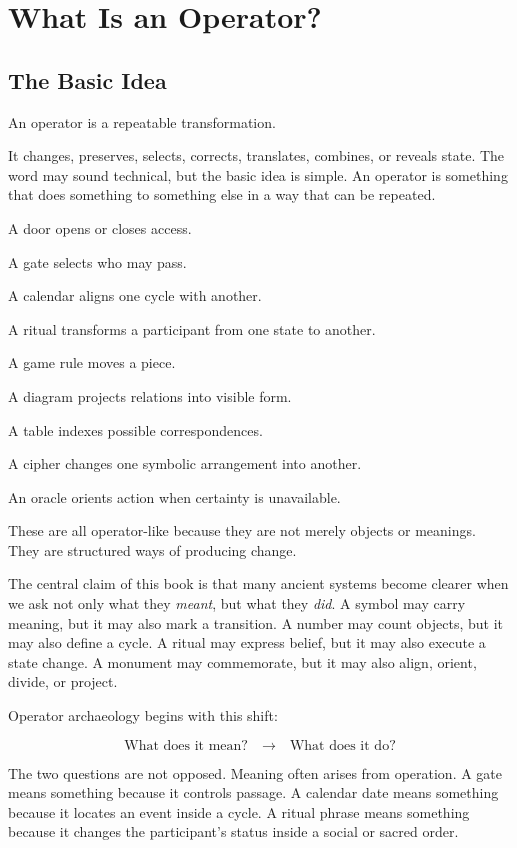 \documentclass[11pt]{book}
\begin{document}
\chapter{What Is an Operator?}

\section{The Basic Idea}

An operator is a repeatable transformation.

It changes, preserves, selects, corrects, translates, combines, or reveals state. The word may sound technical, but the basic idea is simple. An operator is something that does something to something else in a way that can be repeated.

A door opens or closes access.

A gate selects who may pass.

A calendar aligns one cycle with another.

A ritual transforms a participant from one state to another.

A game rule moves a piece.

A diagram projects relations into visible form.

A table indexes possible correspondences.

A cipher changes one symbolic arrangement into another.

An oracle orients action when certainty is unavailable.

These are all operator-like because they are not merely objects or meanings. They are structured ways of producing change.

The central claim of this book is that many ancient systems become clearer when we ask not only what they \emph{meant}, but what they \emph{did}. A symbol may carry meaning, but it may also mark a transition. A number may count objects, but it may also define a cycle. A ritual may express belief, but it may also execute a state change. A monument may commemorate, but it may also align, orient, divide, or project.

Operator archaeology begins with this shift:

\[
\text{What does it mean?}
\quad \longrightarrow \quad
\text{What does it do?}
\]

The two questions are not opposed. Meaning often arises from operation. A gate means something because it controls passage. A calendar date means something because it locates an event inside a cycle. A ritual phrase means something because it changes the participant's status inside a social or sacred order.
\end{document}
